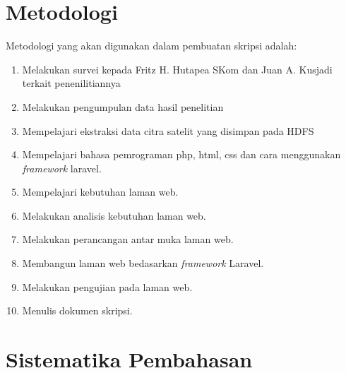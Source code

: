 \section{Metodologi}
\label{sec:metlit}
Metodologi yang akan digunakan dalam pembuatan skripsi adalah:
\begin{enumerate}
	\item Melakukan survei kepada Fritz H. Hutapea SKom dan Juan A. Kusjadi terkait penenilitiannya
	\item Melakukan pengumpulan data hasil penelitian
	\item Mempelajari ekstraksi data citra satelit yang disimpan pada HDFS
	\item Mempelajari bahasa pemrograman php, html, css dan cara menggunakan \emph{framework} laravel.
	\item Mempelajari kebutuhan laman web.
	\item Melakukan analisis kebutuhan laman web.
	\item Melakukan perancangan antar muka laman web.
	\item Membangun laman web bedasarkan \emph{framework} Laravel.
	\item Melakukan pengujian pada laman web.
	\item Menulis dokumen skripsi.
\end{enumerate}

\section{Sistematika Pembahasan}
\label{sec:sispem}

